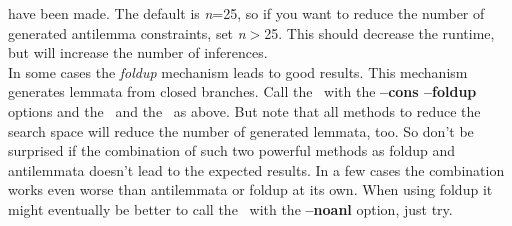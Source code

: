 \begin{description}
{      have been made. The default is {\it n\/}=25, so if you want to
      reduce the number of generated antilemma constraints, set {\it
      n\/}$>$25. This should decrease the runtime, but will increase
      the number of inferences.\\
      In some cases the {\it foldup\/} mechanism leads to good
      results. This mechanism generates lemmata from closed
      branches. Call the \inw\ with the {\bf --cons --foldup} options 
      and the \wasm\ and the \sam\ as above. But note that all methods
      to reduce the search space will reduce the number of generated
      lemmata, too. So don't be surprised if the combination of such
      two powerful methods as foldup and antilemmata doesn't lead to
      the expected results. In a few cases the combination works even 
      worse than antilemmata or foldup at its own. When using foldup 
      it might eventually be better to call the \sam\ with the {\bf
      --noanl} option, just try.}  
\end{description}


